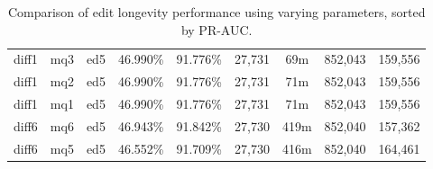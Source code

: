 \begin{sidewaystable}[!ph]
\begin{center}
\begin{tabular}{|c|c|c||c|c||c|c|c|c|}
diff1 & mq3 & ed5 & 46.990\% & 91.776\% & 27,731 & 69m & 852,043 & 159,556 \\
diff1 & mq2 & ed5 & 46.990\% & 91.776\% & 27,731 & 71m & 852,043 & 159,556 \\
diff1 & mq1 & ed5 & 46.990\% & 91.776\% & 27,731 & 71m & 852,043 & 159,556 \\
diff6 & mq6 & ed5 & 46.943\% & 91.842\% & 27,730 & 419m & 852,040 & 157,362 \\
diff6 & mq5 & ed5 & 46.552\% & 91.709\% & 27,730 & 416m & 852,040 & 164,461 \\
\hline
\end{tabular}
\end{center}
\caption{Comparison of edit longevity performance using
    varying parameters, sorted by PR-AUC.}
\label{tab:editshoutA}
\end{sidewaystable}
\clearpage
